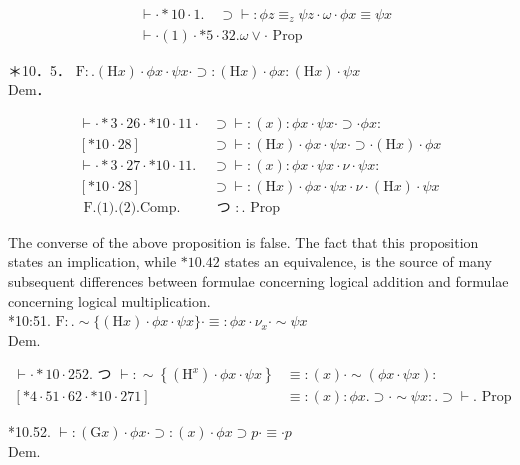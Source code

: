 \documentclass[10pt]{article}
\begin{document}
\begin{align*}
& \vdash \cdot * 10 \cdot 1 . \quad \supset \vdash: \phi z \equiv_{z} \psi z \cdot \omega \cdot \phi x \equiv \psi x  \tag{1}\\
& \vdash \cdot(1) \cdot * 5 \cdot 32 . \omega \vee \cdot \text { Prop }
\end{align*}


＊10．5． $\mathrm{F}: .(\mathrm{H} x) \cdot \phi x \cdot \psi x \cdot \supset:(\mathrm{H} x) \cdot \phi x:(\mathrm{H} x) \cdot \psi x$\\
Dem．

\[
\begin{array}{ll}
\vdash \cdot * 3 \cdot 26 \cdot * 10 \cdot 11 \cdot & \supset \vdash:(x): \phi x \cdot \psi x \cdot \supset \cdot \phi x: \\
{[* 10 \cdot 28]} & \supset \vdash:(\mathrm{H} x) \cdot \phi x \cdot \psi x \cdot \supset \cdot(\mathrm{H} x) \cdot \phi x \\
\vdash \cdot * 3 \cdot 27 \cdot * 10 \cdot 11 . & \supset \vdash:(x): \phi x \cdot \psi x \cdot \nu \cdot \psi x: \\
{[* 10 \cdot 28]} & \supset \vdash:(\mathrm{H} x) \cdot \phi x \cdot \psi x \cdot \nu \cdot(\mathrm{H} x) \cdot \psi x  \tag{2}\\
\text { F.(1).(2).Comp. } & \text { つ }: . \text { Prop }
\end{array}
\]

The converse of the above proposition is false. The fact that this proposition states an implication, while $* 10.42$ states an equivalence, is the source of many subsequent differences between formulae concerning logical addition and formulae concerning logical multiplication.\\
*10:51. $\mathrm{F}: . \sim\{(\mathrm{H} x) \cdot \phi x \cdot \psi x\} \cdot \equiv: \phi x \cdot \nu_{x} \cdot \sim \psi x$\\
Dem.

$$
\begin{aligned}
\vdash \cdot * 10 \cdot 252 . \text { つ } \vdash: \sim\left\{\left(\mathrm{H}^{x}\right) \cdot \phi x \cdot \psi x\right\} & \equiv:(x) \cdot \sim(\phi x \cdot \psi x): \\
{[* 4 \cdot 51 \cdot 62 \cdot * 10 \cdot 271] } & \equiv:(x): \phi x . \supset \cdot \sim \psi x: . \supset \vdash . \text { Prop }
\end{aligned}
$$

*10.52. $\vdash:(\mathrm{G} x) \cdot \phi x \cdot \supset:(x) \cdot \phi x \supset p \cdot \equiv \cdot p$\\
Dem.
\end{document}
